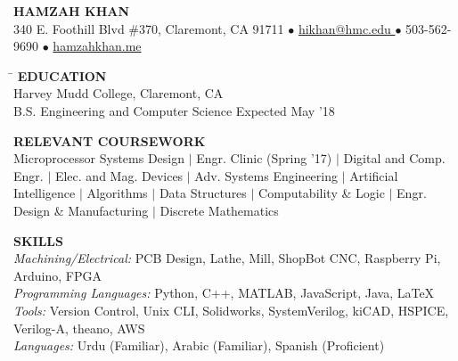 \documentclass[10.75pt]{article}
\makeatletter
\newcommand{\selfName}{\huge\textbf{ HAMZAH KHAN }}
\newcommand{\addrA}{\normalsize 340 E. Foothill Blvd \#370, }
\newcommand{\addrB}{\normalsize Claremont, CA 91711}
\newcommand{\email}{\url{ hikhan@hmc.edu }}
\newcommand{\phone}{ 503-562-9690 }
\newcommand{\website}{ \url{hamzahkhan.me} }
\newcommand{\headerdot}{  $\bullet$  }
\newcommand{\vb}{ $\mid$ }
\newcommand{\sectionNL}{\\[2pt]}
\makeatother
\begin{document}

\begin{center}
\selfName \\
\addrA \addrB \headerdot \email \headerdot \phone \headerdot \website
\end{center}



\begin{tabbing}
\hspace*{6.5in}\= \kill
{\textbf{EDUCATION} } \> \sectionNL
Harvey Mudd College, Claremont, CA \> \\
B.S. Engineering and Computer Science \> Expected May '18
\end{tabbing}

\begin{flushleft}
{\textbf{RELEVANT COURSEWORK}} \sectionNL
Microprocessor Systems Design \vb Engr. Clinic (Spring '17) \vb Digital and Comp. Engr. \vb Elec. and Mag. Devices \vb Adv. Systems Engineering \vb Artificial Intelligence \vb Algorithms \vb Data Structures \vb Computability \& Logic \vb Engr. Design \& Manufacturing \vb Discrete Mathematics
\end{flushleft}

\begin{flushleft}
	{\textbf{SKILLS}} \sectionNL
	\textit{Machining/Electrical:} PCB Design, Lathe, Mill, ShopBot CNC, Raspberry Pi, Arduino, FPGA \\

	\textit{Programming Languages:} Python, C++, MATLAB, JavaScript, Java, \LaTeX \\

	\textit{Tools:} Version Control, Unix CLI, Solidworks, SystemVerilog, kiCAD, HSPICE, Verilog-A, theano, AWS \\

	\textit{Languages:} Urdu (Familiar), Arabic (Familiar), Spanish (Proficient)
\end{flushleft}
\end{document}
